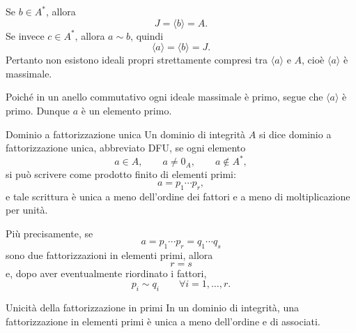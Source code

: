 \documentclass[a4paper]{article}
\begin{document}
\begin{radioactive}
\begin{snippetproof}{}
    Se \(b\in A^\ast\), allora
    \[
        J=\langle b \rangle=A.
    \]
    Se invece \(c\in A^\ast\), allora \(a\sim b\), quindi
    \[
        \langle a \rangle=\langle b \rangle=J.
    \]
    Pertanto non esistono ideali propri strettamente compresi tra \(\langle a \rangle\) e \(A\), cioè \(\langle a \rangle\) è massimale.

    Poiché in un anello commutativo ogni ideale massimale è primo, segue che \(\langle a \rangle\) è primo.
    Dunque \(a\) è un elemento primo.
\end{snippetproof}
\end{radioactive}

\begin{radioactive}
\begin{snippetdefinition}{Dominio a fattorizzazione unica}
    Un dominio di integrità \(A\) si dice dominio a fattorizzazione unica, abbreviato DFU, se ogni elemento
    \[
        a\in A,
        \qquad
        a\neq 0_A,
        \qquad
        a\notin A^\ast,
    \]
    si può scrivere come prodotto finito di elementi primi:
    \[
        a=p_1\cdots p_r,
    \]
    e tale scrittura è unica a meno dell'ordine dei fattori e a meno di moltiplicazione per unità.

    Più precisamente, se
    \[
        a=p_1\cdots p_r=q_1\cdots q_s
    \]
    sono due fattorizzazioni in elementi primi, allora
    \[
        r=s
    \]
    e, dopo aver eventualmente riordinato i fattori,
    \[
        p_i\sim q_i
        \qquad
        \forall i=1,\ldots,r.
    \]
\end{snippetdefinition}
\end{radioactive}

\begin{radioactive}
\begin{snippetproposition}{Unicità della fattorizzazione in primi}
    In un dominio di integrità, una fattorizzazione in elementi primi è unica a meno dell'ordine e di associati.
\end{snippetproposition}
\end{radioactive}
\end{document}
